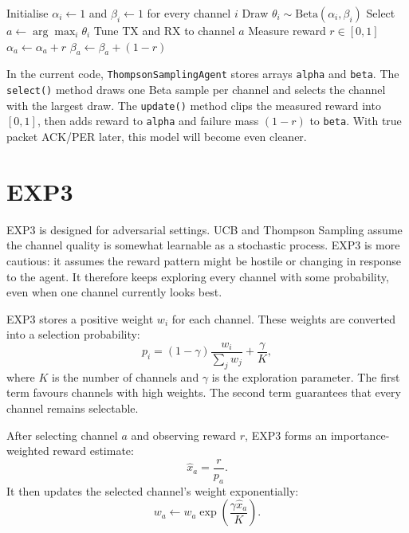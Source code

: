 \documentclass[11pt,a4paper]{article}
\begin{document}
\begin{algorithm}[H]
\caption{Thompson Sampling Channel Selection}
\begin{algorithmic}[1]
\State Initialise $\alpha_i \gets 1$ and $\beta_i \gets 1$ for every channel $i$
        \State Draw $\theta_i \sim \mathrm{Beta}(\alpha_i,\beta_i)$
    \EndFor
    \State Select $a \gets \arg\max_i \theta_i$
    \State Tune TX and RX to channel $a$
    \State Measure reward $r \in [0,1]$
    \State $\alpha_a \gets \alpha_a + r$
    \State $\beta_a \gets \beta_a + (1-r)$
\EndFor
\end{algorithmic}
\end{algorithm}

\begin{implbox}
In the current code, \texttt{ThompsonSamplingAgent} stores arrays \texttt{alpha} and \texttt{beta}. The \texttt{select()} method draws one Beta sample per channel and selects the channel with the largest draw. The \texttt{update()} method clips the measured reward into $[0,1]$, then adds reward to \texttt{alpha} and failure mass $(1-r)$ to \texttt{beta}. With true packet ACK/PER later, this model will become even cleaner.
\end{implbox}

\section{EXP3}

\begin{intuitionbox}
EXP3 is designed for adversarial settings. UCB and Thompson Sampling assume the channel quality is somewhat learnable as a stochastic process. EXP3 is more cautious: it assumes the reward pattern might be hostile or changing in response to the agent. It therefore keeps exploring every channel with some probability, even when one channel currently looks best.
\end{intuitionbox}

EXP3 stores a positive weight $w_i$ for each channel. These weights are converted into a selection probability:
\begin{equation}
    p_i = (1-\gamma)\frac{w_i}{\sum_j w_j} + \frac{\gamma}{K},
\end{equation}
where $K$ is the number of channels and $\gamma$ is the exploration parameter. The first term favours channels with high weights. The second term guarantees that every channel remains selectable.

After selecting channel $a$ and observing reward $r$, EXP3 forms an importance-weighted reward estimate:
\begin{equation}
    \hat{x}_a = \frac{r}{p_a}.
\end{equation}
It then updates the selected channel's weight exponentially:
\begin{equation}
    w_a \gets w_a\exp\left(\frac{\gamma \hat{x}_a}{K}\right).
\end{equation}
\end{document}

